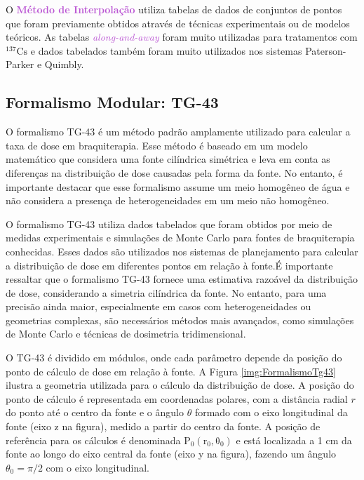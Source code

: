 \documentclass[11pt,a4paper]{article}
\begin{document}
	O \textbf{\textcolor{MediumOrchid}{Método de Interpolação}} utiliza tabelas de dados de conjuntos de pontos que foram previamente obtidos através de técnicas experimentais ou de modelos teóricos. As tabelas \textit{\textcolor{MediumOrchid}{along-and-away}} foram muito utilizadas para tratamentos com $\mathrm{{}^{137}Cs}$ e dados tabelados também foram muito utilizados nos sistemas Paterson-Parker e Quimbly.

\subsection*{Formalismo Modular: TG-43}

		O formalismo TG-43 é um método padrão amplamente utilizado para calcular a taxa de dose em braquiterapia. Esse método é baseado em um modelo matemático que considera uma fonte cilíndrica simétrica e leva em conta as diferenças na distribuição de dose causadas pela forma da fonte. No entanto, é importante destacar que esse formalismo assume um meio homogêneo de água e não considera a presença de heterogeneidades em um meio não homogêneo.
		
		O formalismo TG-43 utiliza dados tabelados que foram obtidos por meio de medidas experimentais e simulações de Monte Carlo para fontes de braquiterapia conhecidas. Esses dados são utilizados nos sistemas de planejamento para calcular a distribuição de dose em diferentes pontos em relação à fonte.É importante ressaltar que o formalismo TG-43 fornece uma estimativa razoável da distribuição de dose, considerando a simetria cilíndrica da fonte. No entanto, para uma precisão ainda maior, especialmente em casos com heterogeneidades ou geometrias complexas, são necessários métodos mais avançados, como simulações de Monte Carlo e técnicas de dosimetria tridimensional.

		O TG-43 é dividido em módulos, onde cada parâmetro depende da posição do ponto de cálculo de dose em relação à fonte. A Figura \ref{img:FormalismoTg43} ilustra a geometria utilizada para o cálculo da distribuição de dose. A posição do ponto de cálculo é representada em coordenadas polares, com a distância radial $r$ do ponto até o centro da fonte e o ângulo $\theta$ formado com o eixo longitudinal da fonte (eixo z na figura), medido a partir do centro da fonte. A posição de referência para os cálculos é denominada $\mathrm{P_0(r_0, \theta_0)}$ e está localizada a 1 cm da fonte ao longo do eixo central da fonte (eixo y na figura), fazendo um ângulo $\theta_0 = \pi / 2$ com o eixo longitudinal.
\end{document}
